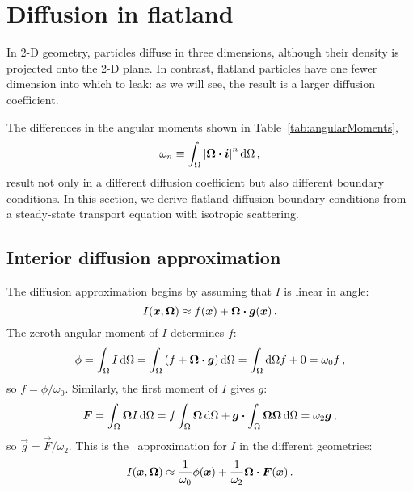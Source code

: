 \section{Diffusion in flatland}

In 2-D geometry, particles diffuse in three dimensions, although their density
is projected onto the 2-D plane. In contrast, flatland particles have one fewer
dimension into which to leak: as we will see, the result is a larger diffusion
coefficient.

The differences in the angular moments shown in Table~\ref{tab:angularMoments},
\begin{equation*}
  \omega_n \equiv \int_\Omega \left| \bm{\Omega} \bm{\cdot} \bm{i} \right|^n \mathop{}\!\mathrm{d} \Omega\,,
\end{equation*}
result not
only in a different diffusion coefficient but also different boundary
conditions. In this section, we derive flatland diffusion boundary conditions
from a steady-state transport equation with isotropic scattering.

\subsection{Interior diffusion approximation}

The diffusion approximation begins by assuming that $I$ is linear in angle:
\begin{equation*}
  I(\bm{x}, \bm{\Omega}) \approx f(\bm{x}) + \bm{\Omega} \bm{\cdot}
  \bm{g}(\bm{x})\,.
\end{equation*}
The zeroth angular moment of $I$ determines $f$:
\begin{equation*}
  \phi = \int_\Omega I \mathop{}\!\mathrm{d} \Omega
= \int_\Omega \left( f + \bm{\Omega}\bm{\cdot} \bm{g} \right) \mathop{}\!\mathrm{d}\Omega
= \int_\Omega\mathop{}\!\mathrm{d}\Omega f + 0
= \omega_0 f \,,
\end{equation*}
so $f = \phi/\omega_0$. Similarly, the first moment of $I$ gives $g$:
\begin{equation*}
  \bm{F} = \int_\Omega \bm{\Omega} I \mathop{}\!\mathrm{d} \Omega
= f \int_\Omega \bm{\Omega} \mathop{}\!\mathrm{d}\Omega
  + \bm{g} \bm{\cdot} \int_\Omega \bm{\Omega}\bm{\Omega} \mathop{}\!\mathrm{d}\Omega
= \omega_2 \bm{g} \,,
\end{equation*}
so $\vec{g} = \vec{F}/\omega_2$. This is the \Pone\ approximation for $I$ in the different geometries:
\begin{equation}\label{eq:ssPone}
  I(\bm{x}, \bm{\Omega})
  \approx \frac{1}{\omega_0} \phi(\bm{x})
  + \frac{1}{\omega_2} \bm{\Omega} \bm{\cdot} \bm{F}(\bm{x})\,.
\end{equation}

